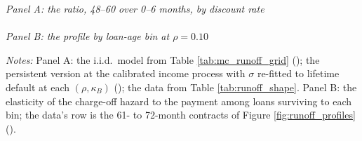 \begin{table}[!ht]
\centering
\caption{The run-off of the payment elasticity: by discount rate and balance penalty, and by loan-age bin}
\label{tab:persistent_runoff}
\small
\textit{Panel A: the ratio, 48--60 over 0--6 months, by discount rate}\\[0.4em]
\resizebox{0.95\textwidth}{!}{}\\[0.8em]
\textit{Panel B: the profile by loan-age bin at $\rho = 0.10$}\\[0.4em]
\resizebox{0.95\textwidth}{!}{}
\vspace{0.5em}
\begin{minipage}{0.95\textwidth}
\noindent \small \textit{Notes:} Panel A: the i.i.d.\ model from Table \ref{tab:mc_runoff_grid} (); the persistent version at the calibrated income process with $\sigma$ re-fitted to lifetime default at each $(\rho, \kappa_B)$ (); the data from Table \ref{tab:runoff_shape}. Panel B: the elasticity of the charge-off hazard to the payment among loans surviving to each bin; the data's row is the 61- to 72-month contracts of Figure \ref{fig:runoff_profiles} ().
\end{minipage}
\end{table}

